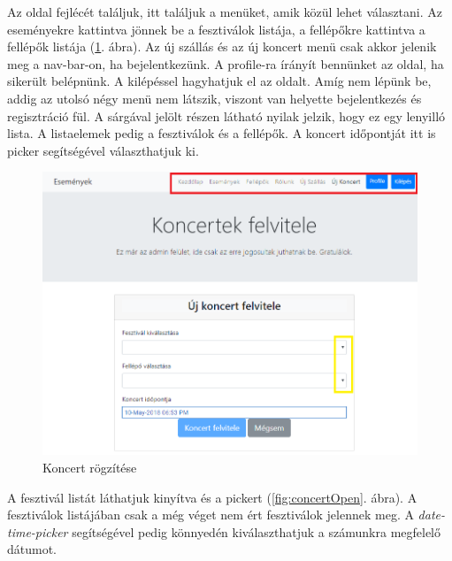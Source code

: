 Az oldal fejlécét találjuk, itt találjuk a menüket, amik közül lehet választani. Az eseményekre kattintva jönnek be a fesztiválok listája, a fellépőkre kattintva a fellépők listája (\ref{fig:concert}. ábra). Az új szállás és az új koncert menü csak akkor jelenik meg a nav-bar-on, ha bejelentkezünk. A profile-ra írányít bennünket az oldal, ha sikerült belépnünk. A kilépéssel hagyhatjuk el az oldalt. Amíg nem lépünk be, addig az utolsó négy menü nem látszik, viszont van helyette bejelentkezés és regisztráció fül. A sárgával jelölt részen látható nyilak jelzik, hogy ez egy lenyilló lista. A listaelemek pedig a fesztiválok és a fellépők. A koncert időpontját itt is picker segítségével választhatjuk ki.

\begin{figure}[h!]
\centering
\includegraphics[scale=0.64]{kepek/concertUp.png}
\caption{Koncert rögzítése}
\label{fig:concert}
\end{figure}

A fesztivál listát láthatjuk kinyítva és a pickert (\ref{fig:concertOpen}. ábra). A fesztiválok listájában csak a még véget nem ért fesztiválok jelennek meg. A \textit{date-time-picker} segítségével pedig könnyedén kiválaszthatjuk a számunkra megfelelő dátumot.

